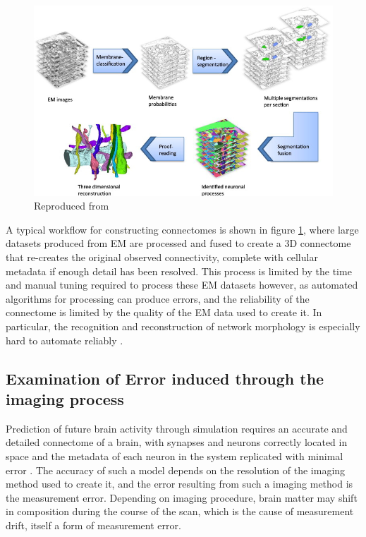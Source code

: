 \begin{figure}[h!]
    \centering
    \includegraphics[scale=0.75]{figures/images/reconstruction.jpg}
    {Reproduced from \cite{kaynig_large-scale_2015}}
    \label{reconstruction}
\end{figure}

A typical workflow for constructing
connectomes is shown in figure \ref{reconstruction}, where large datasets
produced from EM are processed and fused to create a 3D connectome that
re-creates the original observed connectivity, complete with cellular metadata
if enough detail has been resolved. This process is limited by the time and
manual tuning required to process these EM datasets however, as automated
algorithms for processing can produce errors, and the reliability of the
connectome is limited by the quality of the EM data used to create it. 
\autocite{pallotto_extracellular_2015} In
particular, the recognition and reconstruction of network morphology is
especially hard to automate reliably \autocite{helmstaedter_connectomic_2013}.

\subsection[Error induced through noise]{Examination of Error induced through the imaging process}

Prediction of future brain activity through simulation requires an accurate and
detailed connectome of a brain, with synapses and neurons correctly located in
space and the metadata of each neuron in the system replicated with minimal
error \autocite{bostrom_whole_2008}. The accuracy of such a model depends on the
resolution of the imaging method used to create it, and the error resulting from
such a imaging method is the measurement error. Depending on imaging procedure, brain matter may shift in composition during the course of the scan, which is the cause of measurement drift, itself a form of measurement error.

